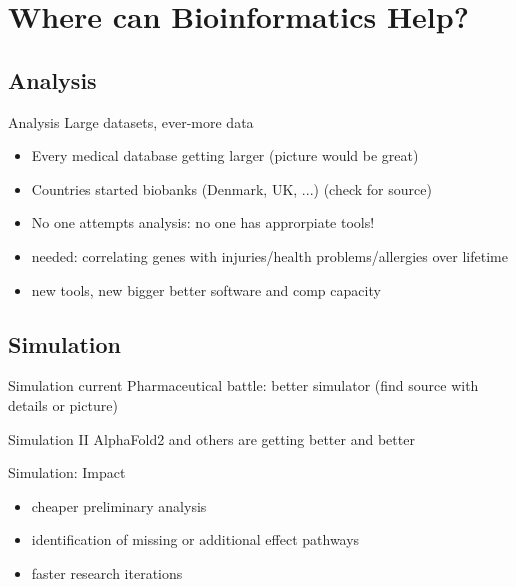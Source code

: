 \section{Where can Bioinformatics Help?}
\subsection{Analysis}

\begin{frame}[c]{Analysis}
    \large
    Large datasets, ever-more data

    \begin{itemize}[<+(1)->]
        \item Every medical database getting larger (picture would be great)
        \item Countries started biobanks (Denmark, UK, ...) (check for source)
        \item No one attempts analysis: no one has approrpiate tools!
        \item needed: correlating genes with injuries/health problems/allergies over lifetime 
        \item new tools, new bigger better software and comp capacity
    \end{itemize}
\end{frame}


\subsection{Simulation}

\begin{frame}[c]{Simulation}
    current Pharmaceutical battle: better simulator (find source with details or picture)
\end{frame}

\begin{frame}[c]{Simulation II}
    AlphaFold2 and others are getting better and better
\end{frame}

\begin{frame}[c]{Simulation: Impact}
    
    \begin{itemize}[<+(1)->]
        \item cheaper preliminary analysis
        \item identification of missing or additional effect pathways
        \item faster research iterations
    \end{itemize}
\end{frame}
